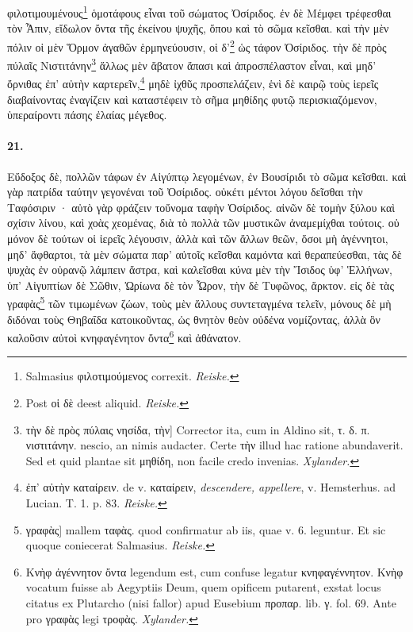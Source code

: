 \documentclass[a4paper, 11pt, oneside, polutonikogreek, german]{article}
\begin{document}
φιλοτιμουμένους\footnote{Salmasius φιλοτιμούμενος correxit. \emph{Reiske.}} ὁμοτάφους εἶναι τοῦ σώματος Ὀσίριδος. ἐν δὲ Μέμφει τρέφεσθαι τὸν Ἆπιν, εἴδωλον ὄντα τῆς ἐκείνου ψυχῆς, ὅπου καὶ τὸ σῶμα κεῖσθαι. καὶ τὴν μὲν πόλιν οἱ μὲν Ὅρμον ἀγαθῶν ἑρμηνεύουσιν, οἱ δ'\footnote{Post οἱ δὲ deest aliquid. \emph{Reiske.}} ὡς τάφον Ὀσίριδος. τὴν δὲ πρὸς πύλαῖς Νιστιτάνην\footnote{τὴν δὲ πρὸς πύλαις νησίδα, τὴν] Corrector ita, cum in Aldino sit, τ. δ. π. νιστιτάνην. nescio, an nimis audacter. Certe τὴν illud hac ratione abundaverit. Sed et quid plantae sit μηθίδη, non facile credo invenias. \emph{Xylander.}} ἄλλως μὲν ἄβατον ἅπασι καὶ ἀπροσπέλαστον εἶναι, καὶ μηδ' ὄρνιθας ἐπ' αὐτὴν καρτερεῖν,\footnote{ἐπ' αὐτὴν καταίρειν. de v. καταίρειν, \emph{descendere, appellere}, v. Hemsterhus. ad Lucian. T. 1. p. 83. \emph{Reiske.}} μηδὲ ἰχθῦς προσπελάζειν, ἑνὶ δὲ καιρῷ τοὺς ἱερεῖς διαβαίνοντας ἐναγίζειν καὶ καταστέφειν τὸ σῆμα μηθίδης φυτῷ περισκιαζόμενον, ὑπεραίροντι πάσης ἐλαίας μέγεθος.

\paragraph{21.}
Εὔδοξος δὲ, πολλῶν τάφων ἐν Αἰγύπτῳ λεγομένων, ἐν Βουσίριδι τὸ σῶμα κεῖσθαι. καὶ γὰρ πατρίδα ταύτην γεγονέναι τοῦ Ὀσίριδος. οὐκέτι μέντοι λόγου δεῖσθαι τὴν Ταφόσιριν · αὐτὸ γὰρ φράζειν τοὔνομα ταφὴν Ὀσίριδος. αἰνῶν δὲ τομὴν ξύλου καὶ σχίσιν λίνου, καὶ χοὰς χεομένας, διὰ τὸ πολλὰ τῶν μυστικῶν ἀναμεμίχθαι τούτοις. οὐ μόνον δὲ τούτων οἱ ἱερεῖς λέγουσιν, ἀλλὰ καὶ τῶν ἄλλων θεῶν, ὅσοι μὴ ἀγέννητοι, μηδ' ἄφθαρτοι, τὰ μὲν σώματα παρ' αὐτοῖς κεῖσθαι καμόντα καὶ θεραπεύεσθαι, τὰς δὲ ψυχὰς ἐν οὐρανῷ λάμπειν ἄστρα, καὶ καλεῖσθαι κύνα μὲν τὴν Ἴσιδος ὑφ' Ἑλλήνων, ὑπ' Αἰγυπτίων δὲ Σῶθιν, Ὠρίωνα δὲ τὸν Ὦρον, τὴν δὲ Τυφῶνος, ἄρκτον. εἰς δὲ τὰς γραφὰς\footnote{γραφὰς] mallem ταφὰς. quod confirmatur ab iis, quae v. 6. leguntur. Et sic quoque coniecerat Salmasius. \emph{Reiske.}} τῶν τιμωμένων ζώων, τοὺς μὲν ἄλλους συντεταγμένα τελεῖν, μόνους δὲ μὴ διδόναι τοὺς Θηβαΐδα κατοικοῦντας, ὡς θνητὸν θεὸν οὐδένα νομίζοντας, ἀλλὰ ὃν καλοῦσιν αὐτοὶ κνηφαγένητον ὄντα\footnote{Κνὴφ ἀγέννητον ὄντα legendum est, cum confuse legatur κνηφαγέννητον. Κνὴφ vocatum fuisse ab Aegyptiis Deum, quem opificem putarent, exstat locus citatus ex Plutarcho (nisi fallor) apud Eusebium προπαρ. lib. γ. fol. 69. Ante pro γραφὰς legi τροφὰς. \emph{Xylander.}} καὶ ἀθάνατον.
\end{document}
